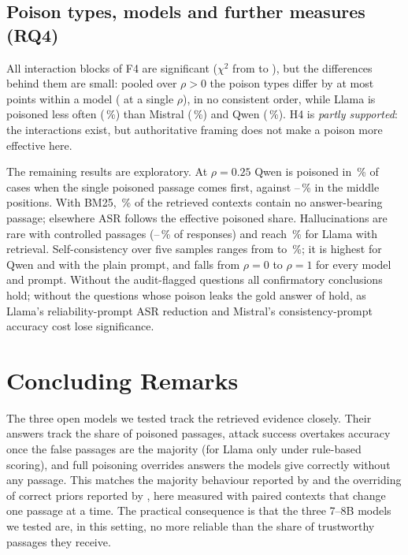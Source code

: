 \documentclass[pdflatex,sn-mathphys-ay]{sn-jnl}
\begin{document}
\subsection{Poison types, models and further measures (RQ4)}\label{sec:rq4}
All \FFourSig{} interaction blocks of F4 are significant ($\chi^2$ from
\FFourChiRhoType{} to \FFourChiPromptModel), but the differences behind them
are small: pooled over $\rho>0$ the poison types differ by at most
\TypeSpreadPooledMax{} points within a model (\TypeSpreadMax{} at a single
$\rho$), in no consistent order, while Llama is poisoned less often
(\TypeAsrPooledLlama\,\%) than Mistral (\TypeAsrPooledMistral\,\%) and Qwen
(\TypeAsrPooledQwen\,\%). H4 is \emph{partly supported}: the interactions
exist, but authoritative framing does not make a poison more effective here.

The remaining results are exploratory. At $\rho=0.25$ Qwen is poisoned in
\PosAsrQwenFirst\,\% of cases when the single poisoned passage comes first,
against \PosAsrQwenThird--\PosAsrQwenSecond\,\% in the middle positions. With
BM25, \RetrShareLlamaEffNone\,\% of the retrieved contexts contain no
answer-bearing passage; elsewhere ASR follows the effective poisoned share.
Hallucinations are rare with controlled passages
(\HallQwenRhoZero--\HallMistralRhoOne\,\% of responses) and reach \HallLlamaRetrieval\,\% for Llama
with retrieval. Self-consistency over five samples ranges from \ScRangeMin{}
to \ScRangeMax\,\%; it is highest for Qwen and with the plain prompt, and
falls from $\rho=0$ to $\rho=1$ for every model and prompt. Without the
\AuditFlagged{} audit-flagged questions all \SensFlaggedSame{} confirmatory
conclusions hold; without the \LeakQuestions{} questions whose poison leaks
the gold answer
\SensLeaksSame{} of \SensConclusions{} hold, as Llama's reliability-prompt ASR
reduction and Mistral's consistency-prompt accuracy cost lose significance.

\section{Concluding Remarks}\label{sec:conclusions}
The three open models we tested track the retrieved evidence closely.
Their answers track the share of poisoned passages, attack success overtakes accuracy once the false passages are the majority (for Llama only under rule-based scoring), and full poisoning
overrides answers the models give correctly without any passage. This matches
the majority behaviour reported by \citet{jin2024tugofwar} and the overriding
of correct priors reported by \citet{wu2024clasheval}, here measured with
paired contexts that change one passage at a time. The practical consequence
is that the three 7--8B models we tested are, in this setting, no more reliable than the share of trustworthy passages they receive.
\end{document}
